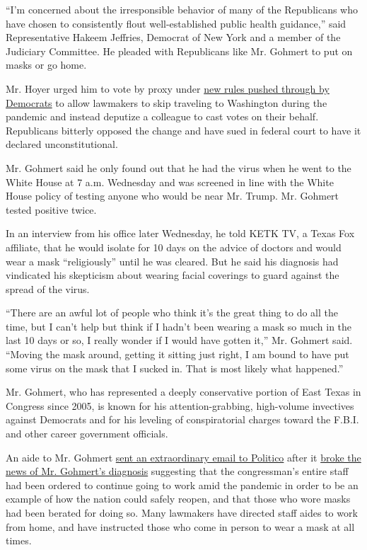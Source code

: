 ``I'm concerned about the irresponsible behavior of many of the
Republicans who have chosen to consistently flout well-established
public health guidance,'' said Representative Hakeem Jeffries, Democrat
of New York and a member of the Judiciary Committee. He pleaded with
Republicans like Mr. Gohmert to put on masks or go home.

Mr. Hoyer urged him to vote by proxy under
\href{https://www.nytimes.com/2020/05/15/us/politics/remote-voting-house-coronavirus.html}{new
rules pushed through by Democrats} to allow lawmakers to skip traveling
to Washington during the pandemic and instead deputize a colleague to
cast votes on their behalf. Republicans bitterly opposed the change and
have sued in federal court to have it declared unconstitutional.

Mr. Gohmert said he only found out that he had the virus when he went to
the White House at 7 a.m. Wednesday and was screened in line with the
White House policy of testing anyone who would be near Mr. Trump. Mr.
Gohmert tested positive twice.

In an interview from his office later Wednesday, he told KETK TV, a
Texas Fox affiliate, that he would isolate for 10 days on the advice of
doctors and would wear a mask ``religiously'' until he was cleared. But
he said his diagnosis had vindicated his skepticism about wearing facial
coverings to guard against the spread of the virus.

``There are an awful lot of people who think it's the great thing to do
all the time, but I can't help but think if I hadn't been wearing a mask
so much in the last 10 days or so, I really wonder if I would have
gotten it,'' Mr. Gohmert said. ``Moving the mask around, getting it
sitting just right, I am bound to have put some virus on the mask that I
sucked in. That is most likely what happened.''

Mr. Gohmert, who has represented a deeply conservative portion of East
Texas in Congress since 2005, is known for his attention-grabbing,
high-volume invectives against Democrats and for his leveling of
conspiratorial charges toward the F.B.I. and other career government
officials.

An aide to Mr. Gohmert
\href{https://twitter.com/JakeSherman/status/1288524502649966592?s=20}{sent
an extraordinary email to Politico} after it
\href{https://www.politico.com/news/2020/07/29/louis-gohmert-who-refused-to-wear-a-mask-tests-positive-for-coronavirus-386076}{broke
the news of Mr. Gohmert's diagnosis} suggesting that the congressman's
entire staff had been ordered to continue going to work amid the
pandemic in order to be an example of how the nation could safely
reopen, and that those who wore masks had been berated for doing so.
Many lawmakers have directed staff aides to work from home, and have
instructed those who come in person to wear a mask at all times.

